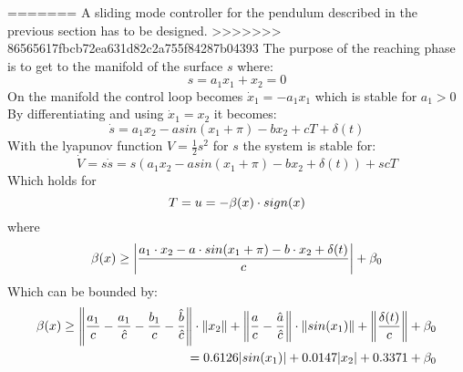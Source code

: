 =======
A sliding mode controller for the pendulum described in the previous section has to be designed. 
>>>>>>> 86565617fbcb72ea631d82c2a755f84287b04393
The purpose of the reaching phase is to get to the manifold of the surface $s $ where:
\begin{equation}
s = a_1 x_1 + x_2 = 0
\end{equation}
On the manifold the control loop becomes $ \dot{x}_1 = - a_1 x_1   $ which is stable for $ a_1 > 0$
By differentiating and using $ \dot{x}_1 = x_2 $ it becomes:
\begin{equation}
\dot{s} = a_1 x_2 - a sin(x_1 + \pi) - b x_2 + c T + \delta (t)
\end{equation}
With the lyapunov function $V = \frac{1}{2} s^2 $ for $ s $ the system is stable for:
\begin{equation}
 \dot{V} = s \dot{s} =  s (a_1 x_2 - a sin(x_1 + \pi) - b x_2  + \delta (t) ) + s c T
\end{equation}
Which holds for
\begin{equation}
T = u = -\beta (x) \cdot sign(x)
\end{equation}
where
\begin{equation}
\beta (x) \geq \left| \frac{a_1 \cdot x_2 - a \cdot sin(x_1 + \pi) - b \cdot x_2  + \delta (t)}{c} \right| + \beta_0
\end{equation}
Which can be bounded by:
\begin{equation}
	\begin{split}
\beta (x) \geq \left\Vert \frac{a_1}{c} - \frac{a_1}{\hat{c}} -  \frac{b_1}{c} - \frac{\hat{b}}{\hat{c}}  \right\Vert \cdot \left\Vert x_2 \right\Vert + \left\Vert \frac{a}{c} - \frac{\hat{a}}{\hat{c}}  \right\Vert \cdot \left\Vert sin(x_1) \right\Vert + \left\Vert \frac{\delta (t)}{c} \right\Vert + \beta_0 \\
= 0.6126 |sin(x_1)| + 0.0147 |x_2| + 0.3371 + \beta_0
\end{split}
\end{equation}
